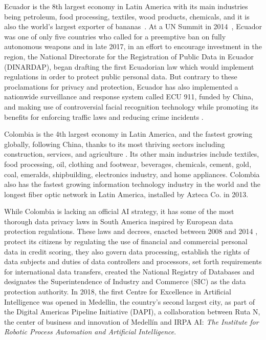 \documentclass[conference]{IEEEtran}
\begin{document}
Ecuador is the 8th largest economy in Latin America with its main industries being petroleum, food processing, textiles, wood products, chemicals, and it is also the world's largest exporter of bananas~\cite{rivera2017synergies}. At a UN Summit in 2014~\cite{jeffries2014only}, Ecuador was one of only five countries who called for a preemptive ban on fully autonomous weapons and in late 2017, in an effort to encourage investment in the region, the National Directorate for the Registration of Public Data in Ecuador (DINARDAP), began drafting the first Ecuadorian law which would implement regulations in order to protect public personal data. But contrary to these proclamations for privacy and protection, Ecuador has also implemented a nationwide surveillance and response system called ECU 911, funded by China, and making use of controversial facial recognition technology while promoting its benefits for enforcing traffic laws and reducing crime incidents \cite{corral2018911}.

Colombia is the 4th largest economy in Latin America, and the fastest growing globally, following China, thanks to its most thriving sectors including construction, services, and agriculture \cite{giraldo2019commodity}. Its other main industries include textiles, food processing, oil, clothing and footwear, beverages, chemicals, cement, gold, coal, emeralds, shipbuilding, electronics industry, and home appliances. Colombia also has the fastest growing information technology industry in the world and the longest fiber optic network in Latin America, installed by Azteca Co. in 2013.

While Colombia is lacking an official AI strategy, it has some of the most thorough data privacy laws in South America inspired by European data protection regulations. These laws and decrees, enacted between 2008 and 2014 \cite{piper2016data}, protect its citizens by regulating the use of financial and commercial personal data in credit scoring, they also govern data processing, establish the rights of data subjects and duties of data controllers and processors, set forth requirements for international data transfers, created the National Registry of Databases and designates the Superintendence of Industry and Commerce (SIC) as the data protection authority. In 2018, the first Centre for Excellence in Artificial Intelligence was opened in Medellin, the country's second largest city, as part of the Digital Americas Pipeline Initiative (DAPI), a collaboration between Ruta N, the center of business and innovation of Medellín and IRPA AI: \emph{The Institute for Robotic Process Automation and Artificial Intelligence}.
\end{document}

